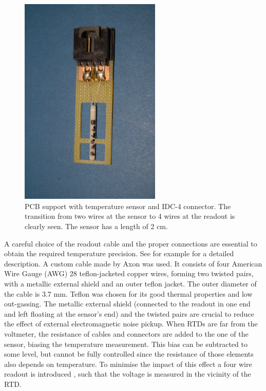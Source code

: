 \begin{figure}[htbp]
\begin{center}
\includegraphics[width=0.6\textwidth, angle=-90]{images/figure_1.jpg}%
\caption{PCB support with temperature sensor and IDC-4 connector. The transition from two wires at the sensor to 4 wires at the readout is clearly seen. The sensor has a length of 2 cm.
\label{fig:sensor}}
\end{center}
\end{figure}

A careful choice of the readout cable and the proper connections are essential to obtain the required temperature precision. See for example \cite{minco} for a detailed description. A custom cable made by Axon \cite{axon} was used. It consists of four American Wire Gauge (AWG) 28 teflon-jacketed copper wires, forming two twisted pairs, with a metallic external shield and an outer teflon jacket. The outer diameter of the cable is 3.7 mm. Teflon was chosen for its good thermal properties and low out-gassing. The metallic external shield (connected to the readout in one end and left floating at the sensor's end) and the twisted pairs are crucial to reduce the effect of external electromagnetic noise pickup. When RTDs are far from the voltmeter, the resistance of cables and connectors are added to the one of the sensor, biasing the temperature measurement. This bias can be subtracted to some level, but cannot be fully controlled since the resistance of those elements also depends on temperature. To minimise the impact of this effect a four wire readout is introduced \cite{minco}, such that the voltage is measured in the vicinity of the RTD.  

